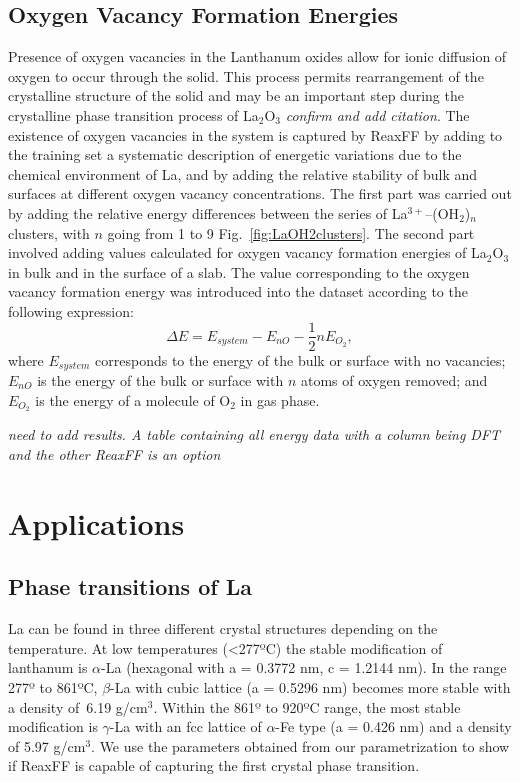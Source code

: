 \documentclass[journal=jpcafh,manuscript=article]{achemso}
\begin{document}
\subsection{Oxygen Vacancy Formation Energies}

Presence of oxygen vacancies in the Lanthanum oxides allow for ionic diffusion of oxygen to occur through the solid.
This process permits rearrangement of the crystalline structure of the solid and may be an important step during the crystalline phase transition process of La$_2$O$_3$ \emph{confirm and add citation}.
The existence of oxygen vacancies in the system is captured by ReaxFF by adding to the training set a systematic description of energetic variations due to the chemical environment of La, and by adding the relative stability of bulk and surfaces at different oxygen vacancy concentrations.
The first part was carried out by adding the relative energy differences between the series of La$^{3+}$--(OH$_2$)$_n$ clusters, with $n$ going from 1 to 9 Fig.~\ref{fig:LaOH2clusters}.
The second part involved adding values calculated for oxygen vacancy formation energies of La$_2$O$_3$ in bulk and in the surface of a slab.
The value corresponding to the oxygen vacancy formation energy was introduced into the dataset according to the following expression:
\begin{equation}
    \Delta E = E_{system} - E_{nO} - \frac{1}{2}nE_{O_2},
\end{equation}
where $E_{system}$ corresponds to the energy of the bulk or surface with no vacancies; $E_{nO}$ is the energy of the bulk or surface with $n$ atoms of oxygen removed; and $E_{O_2}$ is the energy of a molecule of O$_2$ in gas phase.

\emph{need to add results. A table containing all energy data with a column being DFT and the other ReaxFF is an option}


\section{Applications}
\label{sec:applications}

\subsection{Phase transitions of La}

La can be found in three different crystal structures depending on the temperature.
At low temperatures (<277ºC) the stable modification of lanthanum is $\alpha$-La (hexagonal with a = 0.3772 nm, c = 1.2144 nm).
In the range 277º to 861ºC, $\beta$-La with cubic lattice (a = 0.5296 nm) becomes more stable with a density of 6.19 g/cm$^3$.
Within the 861º to 920ºC range, the most stable modification is $\gamma$-La with an fcc lattice of $\alpha$-Fe type (a = 0.426 nm) and a density of 5.97 g/cm$^3$.
We use the parameters obtained from our parametrization to show if ReaxFF is capable of capturing the first crystal phase transition.
\end{document}
